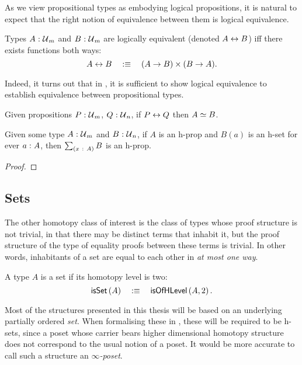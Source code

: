 As we view propositional types as embodying logical propositions, it is natural to
expect that the right notion of equivalence between them is logical equivalence.
\begin{defn}\label{defn:iff}
  Types $A\hspace{0.1mm}:\hspace{0.1mm}\mathcal{U}{}_m$ and $B\hspace{0.1mm}:\hspace{0.1mm}\mathcal{U}{}_m$ are logically equivalent
  (denoted $A \leftrightarrow B$) iff there exists functions both ways:
  \begin{equation*}
    A \leftrightarrow B \quad:\equiv\quad (A \rightarrow B) \times (B \rightarrow A).
  \end{equation*}
\end{defn}
Indeed, it turns out that in \UF{}, it is sufficient to show logical equivalence to
establish equivalence between propositional types.
\begin{prop}\label{prop:iff-equiv}
  Given propositions $P\hspace{0.1mm}:\hspace{0.1mm}\mathcal{U}{}_m$, $Q\hspace{0.1mm}:\hspace{0.1mm}\mathcal{U}{}_n$, if $P \leftrightarrow Q$
  then $A \simeq B$.
\end{prop}

\begin{prop}\label{prop:sigma-prop}
  Given some type $A\hspace{0.1mm}:\hspace{0.1mm}\mathcal{U}{}_m$ and $B\hspace{0.1mm}:\hspace{0.1mm}\mathcal{U}{}_n$, if $A$ is an h-prop
  and $B(a)$ is an h-set for ever $a\hspace{0.1mm}:\hspace{0.1mm}A$, then $\sum_{(x~:~A)} B$ is an h-prop.
\end{prop}
\begin{proof}
\end{proof}

\subsection{Sets}

The other homotopy class of interest is the class of types whose proof structure is not
trivial, in that there may be distinct terms that inhabit it, but the proof structure of
the type of equality proofs between these terms is trivial. In other words, inhabitants of
a set are equal to each other in \emph{at most one way}.
\begin{defn}[Set]\label{defn:hset}
  A type $A$ is a set if its homotopy level is two:
  \begin{equation*}
    \mathsf{isSet}\left(A\right) \quad:\equiv\quad \mathsf{isOfHLevel}\left(A, 2\right).
  \end{equation*}
\end{defn}

Most of the structures presented in this thesis will be based on an underlying partially
ordered \emph{set}. When formalising these in \UF{}, these will be required to be h-sets,
since a poset whose carrier bears higher dimensional homotopy structure does not
correspond to the usual notion of a poset. It would be more accurate to call such a
structure an \emph{$\infty$-poset}.

